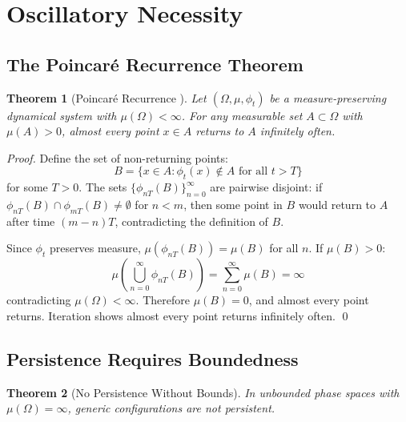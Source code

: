 \documentclass[twocolumn,10pt,a4paper]{article}
\newtheorem{theorem}{Theorem}[section]
\theoremstyle{definition}
\theoremstyle{remark}
\begin{document}
\section{Oscillatory Necessity}
\label{sec:oscillatory}

\subsection{The Poincar\'{e} Recurrence Theorem}

\begin{theorem}[Poincar\'{e} Recurrence \citep{poincare1890}]
\label{thm:poincare}
Let $(\Omega, \mu, \phi_t)$ be a measure-preserving dynamical system with $\mu(\Omega) < \infty$. For any measurable set $A \subset \Omega$ with $\mu(A) > 0$, almost every point $x \in A$ returns to $A$ infinitely often.
\end{theorem}

\begin{proof}
Define the set of non-returning points:
\begin{equation}
    B = \{x \in A : \phi_t(x) \notin A \text{ for all } t > T\}
\end{equation}
for some $T > 0$. The sets $\{\phi_{nT}(B)\}_{n=0}^\infty$ are pairwise disjoint: if $\phi_{nT}(B) \cap \phi_{mT}(B) \neq \emptyset$ for $n < m$, then some point in $B$ would return to $A$ after time $(m-n)T$, contradicting the definition of $B$.

Since $\phi_t$ preserves measure, $\mu(\phi_{nT}(B)) = \mu(B)$ for all $n$. If $\mu(B) > 0$:
\begin{equation}
    \mu\left(\bigcup_{n=0}^\infty \phi_{nT}(B)\right) = \sum_{n=0}^\infty \mu(B) = \infty
\end{equation}
contradicting $\mu(\Omega) < \infty$. Therefore $\mu(B) = 0$, and almost every point returns. Iteration shows almost every point returns infinitely often. \qed
\end{proof}

\subsection{Persistence Requires Boundedness}

\begin{theorem}[No Persistence Without Bounds]
\label{thm:no-persistence}
In unbounded phase spaces with $\mu(\Omega) = \infty$, generic configurations are not persistent.
\end{theorem}
\end{document}
